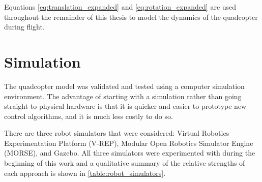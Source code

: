 \documentclass[letterpaper,12pt,titlepage,oneside,final]{book}
\begin{document}
Equations \eqref{eq:translation_expanded} and \eqref{eq:rotation_expanded} are used throughout the remainder of this thesis to model the dynamics of the quadcopter during flight.

\section{Simulation}



The quadcopter model was validated and tested using a computer simulation environment. 
The advantage of starting with a simulation rather than going straight to physical hardware is that it is quicker and easier to prototype new control algorithms, and it is much less costly to do so. 

There are three robot simulators that were considered: Virtual Robotics Experimentation Platform (V-REP)\cite{vrep}, Modular Open Robotics Simulator Engine (MORSE)\cite{echeverria2011modular}, and Gazebo\cite{koenig2004design}. All three simulators were experimented with during the beginning of this work and a qualitative summary of the relative strengths of each approach is shown in \autoref{table:robot_simulators}.
\end{document}
